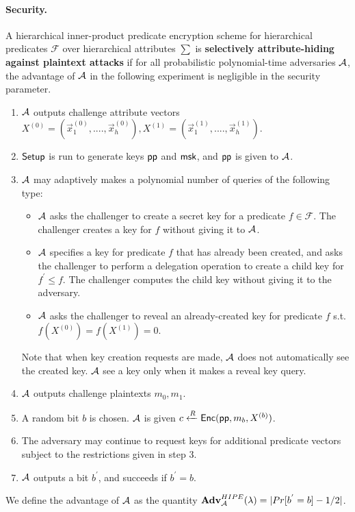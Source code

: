 \paragraph{Security.} A hierarchical inner-product predicate encryption scheme for hierarchical predicates $\mathcal{F}$ over hierarchical attributes $\sum$ is \textbf{selectively attribute-hiding against plaintext attacks} if for all probabilistic polynomial-time adversaries $\mathcal{A}$, the advantage of $\mathcal{A}$ in the following experiment is negligible in the security parameter.
\begin{enumerate}
\item $\mathcal{A}$ outputs challenge attribute vectors $X^{(0)}=(\overrightarrow{x}^{(0)}_{1},....,\overrightarrow{x}^{(0)}_{h}), X^{(1)}=(\overrightarrow{x}^{(1)}_{1},....,\overrightarrow{x}^{(1)}_{h})$.
\item $\mathsf{Setup}$ is run to generate keys $\mathsf{pp}$ and $\mathsf{msk}$, and $\mathsf{pp}$ is given to $\mathcal{A}$.
\item $\mathcal{A}$ may adaptively makes a polynomial number of queries of the following type:
 \begin{itemize}
 \item $\mathcal{A}$ asks the challenger to create a secret key for a predicate $f \in \mathcal{F}$. The challenger creates a key for $f$ without giving it to $\mathcal{A}$.
 \item $\mathcal{A}$ specifies a key for predicate $f$ that has already been created, and asks the challenger to perform a delegation operation to create a child key for $f^{'} \leq f$. The challenger computes the child key without giving it to the adversary.
 \item $\mathcal{A}$ asks the challenger to reveal an already-created key for predicate $f$ s.t. $f(X^{(0)})=f(X^{(1)})=0$.
 \end{itemize}
 Note that when key creation requests are made, $\mathcal{A}$ does not automatically see the created key. $\mathcal{A}$ see a key only when it makes a reveal key query.
\item $\mathcal{A}$ outputs challenge plaintexts $m_{0},m_{1}$.
\item A random bit $b$ is chosen. $\mathcal{A}$ is given $c\xleftarrow{R} \mathsf{Enc}(\mathsf{pp}, m_{b}, X^{(b)})$.
\item The adversary may continue to request keys for additional predicate vectors subject to the restrictions given in step 3.
\item $\mathcal{A}$ outputs a bit $b^{'}$, and succeeds if $b^{'}=b$.
\end{enumerate}
We define the advantage of $\mathcal{A}$ as the quantity $\mathbf{Adv}^{HIPE}_{\mathcal{A}}(\lambda)=|Pr[b^{'}=b]-1/2|$.
